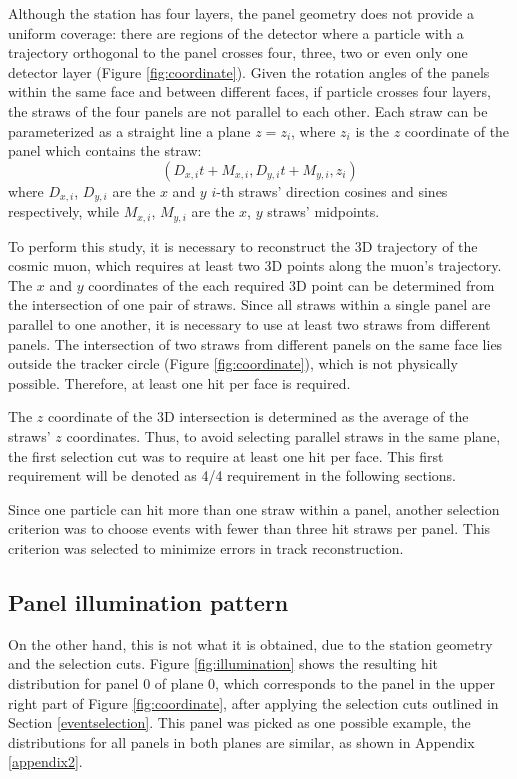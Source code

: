 Although the station has four layers, 
the panel geometry does not provide a uniform
coverage: there are regions of the 
detector where a particle with a trajectory orthogonal
to the panel crosses four, three, two or even only one 
detector layer (Figure \ref{fig:coordinate}). Given the
rotation angles of the panels within the same 
face and between different faces, if  particle
crosses four layers, the straws of the four 
panels are not parallel to each other.
Each straw can be parameterized as a straight line 
 a plane $z = z_i$, where $z_i$ is the $z$ 
coordinate of the panel which contains the straw:
\begin{equation}\label{equaretta}
    (D_{x,i}t+M_{x,i},D_{y,i}t+M_{y,i},z_i)
\end{equation}
where $D_{x,i}$, $D_{y,i}$ are the $x$ and $y$ 
$i$-th straws' direction cosines and sines respectively, 
while $M_{x,i}$, $M_{y,i}$ are the $x$, $y$ straws' midpoints.

To perform this study, it is necessary to 
reconstruct the 3D trajectory of the cosmic muon, 
which requires at least two 3D points along the muon's 
trajectory. The $x$ and $y$ coordinates of 
the each required 3D point can be determined 
from the intersection of one pair of straws. Since all straws within a single panel are parallel to 
one another, it is necessary to use at least two straws from 
different panels. The intersection of two straws from 
different panels on the same face lies outside the tracker circle 
(Figure \ref{fig:coordinate}), which is not physically possible. 
Therefore, at least one hit per face is required.

The $z$ coordinate of the 3D intersection is determined as the average of the 
straws' $z$ coordinates. Thus, to avoid selecting 
parallel straws in the same plane, 
the first selection cut 
was to require at least one hit per face. 
This first requirement will be denoted as 
4/4 requirement in the following sections.

Since one particle can hit more than one straw within a panel, 
another selection criterion was to choose events 
with fewer than three hit straws per panel. 
This criterion was selected to minimize errors 
in track reconstruction.
\subsection{Panel illumination pattern}
%
On the other hand, this is 
not what it is obtained, due to the station geometry
and the selection cuts. 
Figure \ref{fig:illumination} shows the 
resulting hit distribution for panel 0 of
plane 0, which corresponds 
to the panel in 
the upper right part of Figure \ref{fig:coordinate}, 
after applying the selection cuts 
outlined in Section 
\ref{eventselection}. 
This panel was picked as one possible 
example, the 
distributions for all panels in 
both planes are similar, as
shown in Appendix \ref{appendix2}.

